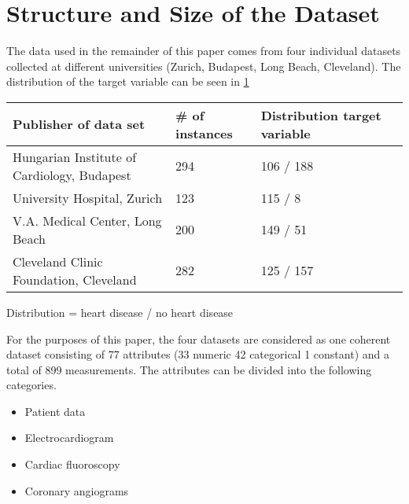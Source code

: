 \section{Structure and Size of the Dataset} \label{sec:dataUnderstanding}


The data used in the remainder of this paper comes from four individual datasets collected at different universities (Zurich, Budapest, Long Beach, Cleveland). The distribution of the target variable can be seen in \cref{table:datasets}
\begin{table}[h]
    \label{table:datasets}
    \begin{footnotesize}
        \begin{tabular}{|l|l|l|l|}
            \hline
            \textbf{Publisher of data set}              & \textbf{\# of instances} & \textbf{Distribution target variable} \\ \hline
            Hungarian Institute of Cardiology, Budapest & 294                      & 106 / 188                             \\ \hline
            University Hospital, Zurich                 & 123                      & 115 / 8                               \\ \hline
            V.A. Medical Center, Long Beach             & 200                      & 149 / 51                              \\ \hline
            Cleveland Clinic Foundation, Cleveland      & 282                      & 125 / 157                             \\ \hline 
        \end{tabular}
    \end{footnotesize}
\end{table}
\begin{center}
    \centering
    Distribution = heart disease / no heart disease
\end{center}
For the purposes of this paper, the four datasets are considered as one coherent dataset consisting of 77 attributes (33 numeric 42 categorical 1 constant) and a total of 899 measurements.  
The attributes can be divided into the following categories. 
\begin{multicols}{2}
    \begin{itemize}
        \item Patient data
        \item Electrocardiogram
        \item Cardiac fluoroscopy
        \item Coronary angiograms
    \end{itemize}
\end{multicols}
